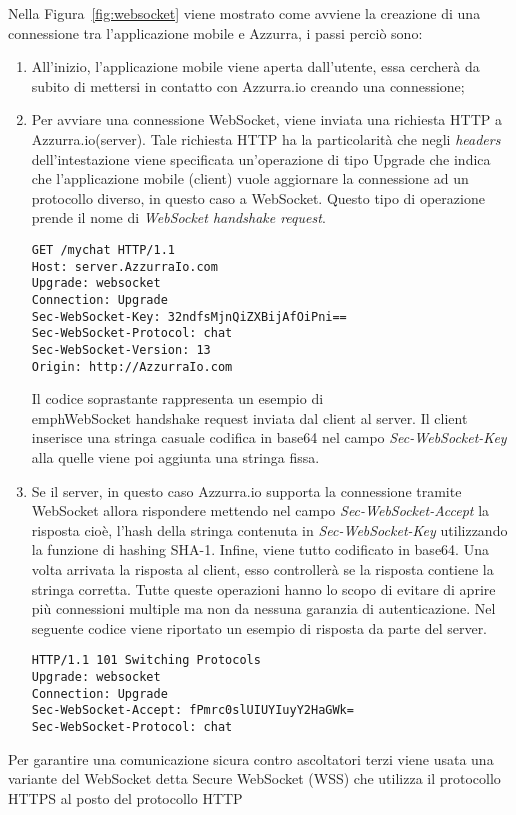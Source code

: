 Nella Figura~\ref{fig:websocket} viene mostrato come avviene la creazione di una connessione tra l'applicazione mobile e Azzurra, i passi perciò sono:
\begin{enumerate}
	\item All'inizio, l'applicazione mobile viene aperta dall'utente, essa cercherà da subito di mettersi in contatto con Azzurra.io creando una connessione;
	\item Per avviare una connessione \gls{WebSocket}\ap{[g]}, viene inviata una richiesta HTTP a Azzurra.io(server). Tale richiesta HTTP ha la particolarità che negli \emph{headers} dell’intestazione viene specificata un'operazione di tipo Upgrade che indica che l'applicazione mobile (client) vuole aggiornare la connessione ad un protocollo diverso, in questo caso a \gls{WebSocket}\ap{[g]}. Questo tipo di operazione prende il nome di \emph{WebSocket handshake request}.\\
	\begin{lstlisting}
GET /mychat HTTP/1.1
Host: server.AzzurraIo.com
Upgrade: websocket	
Connection: Upgrade		
Sec-WebSocket-Key: 32ndfsMjnQiZXBijAfOiPni==
Sec-WebSocket-Protocol: chat		
Sec-WebSocket-Version: 13		
Origin: http://AzzurraIo.com
	\end{lstlisting}
	Il codice soprastante rappresenta un esempio di \\emph{WebSocket handshake request} inviata dal client al server. Il client inserisce una stringa casuale codifica in base64 nel campo \emph{Sec-WebSocket-Key} alla quelle viene poi aggiunta una stringa fissa.
	\item Se il server, in questo caso Azzurra.io supporta la connessione tramite \gls{WebSocket}\ap{[g]} allora rispondere mettendo nel campo \emph{Sec-WebSocket-Accept} la risposta cioè, l'hash della stringa contenuta in \emph{Sec-WebSocket-Key} utilizzando la funzione di hashing SHA-1. Infine, viene tutto codificato in base64. Una volta arrivata la risposta al client, esso controllerà se la risposta contiene la stringa corretta. Tutte queste operazioni hanno lo scopo di evitare di aprire più connessioni multiple ma non da nessuna garanzia di autenticazione.
	Nel seguente codice viene riportato un esempio di risposta da parte del server.\\
	\begin{lstlisting}
HTTP/1.1 101 Switching Protocols
Upgrade: websocket
Connection: Upgrade
Sec-WebSocket-Accept: fPmrc0slUIUYIuyY2HaGWk=
Sec-WebSocket-Protocol: chat
	\end{lstlisting}
\end{enumerate}
Per garantire una comunicazione sicura contro ascoltatori terzi viene usata una variante del \gls{WebSocket}\ap{[g]} detta Secure WebSocket (WSS) che utilizza il protocollo HTTPS al posto del protocollo HTTP
